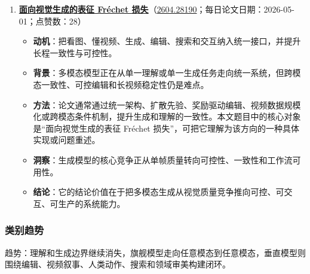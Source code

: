 \begin{enumerate}[leftmargin=1.5em]
  \begin{itemize}[leftmargin=1.5em]
    \item \textbf{动机}：把看图、懂视频、生成、编辑、搜索和交互纳入统一接口，并提升长程一致性与可控性。
    \item \textbf{背景}：多模态模型正在从单一理解或单一生成任务走向统一系统，但跨模态一致性、可控编辑和长视频稳定性仍是难点。
    \item \textbf{方法}：论文通常通过统一架构、扩散先验、奖励驱动编辑、视频数据规模化或跨模态条件机制，提升生成和理解的一致性。本文题目中的核心对象是“Prox-E：基于基本图元抽象的细粒度 3D 形状编辑”，可把它理解为该方向的一种具体实现或问题重述。
    \item \textbf{洞察}：真正有用的世界模型必须同时回答状态会如何变化、动作是否可行以及失败风险在哪里。
    \item \textbf{结论}：它的结论价值在于把多模态生成从视觉质量竞争推向可控、可交互、可生产的系统能力。
  \end{itemize}
  \item \textbf{\href{https://huggingface.co/papers/2604.28190}{面向视觉生成的表征 Fréchet 损失}}（\href{https://arxiv.org/abs/2604.28190}{2604.28190}；每日论文日期：2026-05-01；点赞数：28）
  \begin{itemize}[leftmargin=1.5em]
    \item \textbf{动机}：把看图、懂视频、生成、编辑、搜索和交互纳入统一接口，并提升长程一致性与可控性。
    \item \textbf{背景}：多模态模型正在从单一理解或单一生成任务走向统一系统，但跨模态一致性、可控编辑和长视频稳定性仍是难点。
    \item \textbf{方法}：论文通常通过统一架构、扩散先验、奖励驱动编辑、视频数据规模化或跨模态条件机制，提升生成和理解的一致性。本文题目中的核心对象是“面向视觉生成的表征 Fréchet 损失”，可把它理解为该方向的一种具体实现或问题重述。
    \item \textbf{洞察}：生成模型的核心竞争正从单帧质量转向可控性、一致性和工作流可用性。
    \item \textbf{结论}：它的结论价值在于把多模态生成从视觉质量竞争推向可控、可交互、可生产的系统能力。
  \end{itemize}
\end{enumerate}

\subsubsection{类别趋势}
趋势：理解和生成边界继续消失，旗舰模型走向任意模态到任意模态，垂直模型则围绕编辑、视频叙事、人类动作、搜索和领域审美构建闭环。

